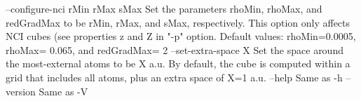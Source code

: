   --configure-nci rMin rMax sMax 	Set the parameters rhoMin, rhoMax,
             		  and redGradMax to be rMin, rMax, and sMax, respectively.
             		  This option only affects NCI cubes (see properties z and
             		  Z in "-p" option. Default values: rhoMin=0.0005,
             		  rhoMax= 0.065, and redGradMax= 2
  --set-extra-space X 	Set the space around the most-external atoms to be X a.u.
             		  By default, the cube is computed within a grid that includes
             		  all atoms, plus an extra space of X=1 a.u.
  --help    		Same as -h
  --version 		Same as -V
